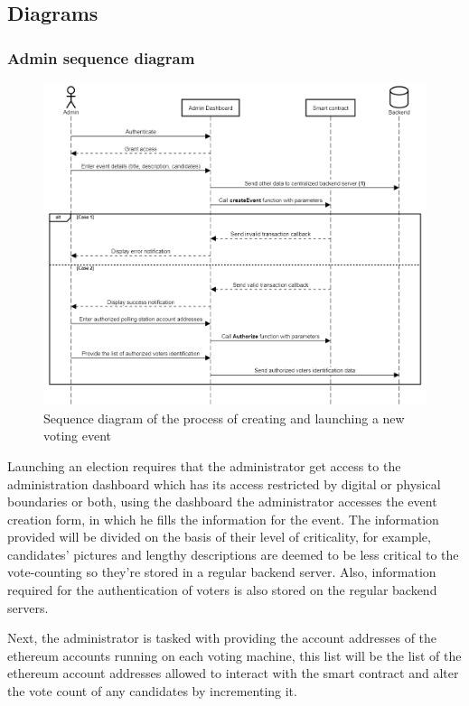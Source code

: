 \subsection{Diagrams}
\subsubsection{Admin sequence diagram}

\begin{figure}[H]
	\centering
		\includegraphics[width=14cm]{images/chapter3/admin_sequence_diagram.png}
		\caption{{\footnotesize Sequence diagram of the process of creating and launching a new voting event}}
\end{figure}

Launching an election requires that the administrator get access to the administration dashboard which has its access restricted by digital or physical boundaries or both, using the dashboard the administrator accesses the event creation form, in which he fills the information for the event. The information provided will be divided on the basis of their level of criticality, for example, candidates' pictures and lengthy descriptions are deemed to be less critical to the vote-counting so they're stored in a regular backend server. Also, information required for the authentication of voters is also stored on the regular backend servers.

Next, the administrator is tasked with providing the account addresses of the ethereum accounts running on each voting machine, this list will be the list of the ethereum account addresses allowed to interact with the smart contract and alter the vote count of any candidates by incrementing it.

